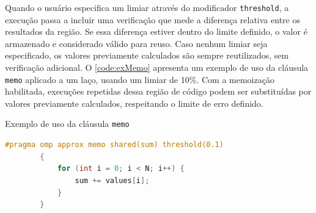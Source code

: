 Quando o usuário especifica um limiar através do modificador \texttt{threshold}, a execução passa a incluir uma verificação que mede a diferença relativa entre os resultados da região. Se essa diferença estiver dentro do limite definido, o valor é armazenado e considerado válido para reuso. Caso nenhum limiar seja especificado, os valores previamente calculados são sempre reutilizados, sem verificação adicional. O \autoref{code:exMemo} apresenta um exemplo de uso da cláusula \texttt{memo} aplicado a um laço, usando um limiar de 10\%. Com a memoização habilitada, execuções repetidas dessa região de código podem ser substituídas por valores previamente calculados, respeitando o limite de erro definido.

\begin{sourcecode}[htb]
    \caption{\label{code:exMemo}Exemplo de uso da cláusula \texttt{memo}}
    \begin{lstlisting}[frame=single, language=C++]
        #pragma omp approx memo shared(sum) threshold(0.1)
        {
            for (int i = 0; i < N; i++) {
                sum += values[i];
            }
        }
    \end{lstlisting}
    \fonte{}
\end{sourcecode}
